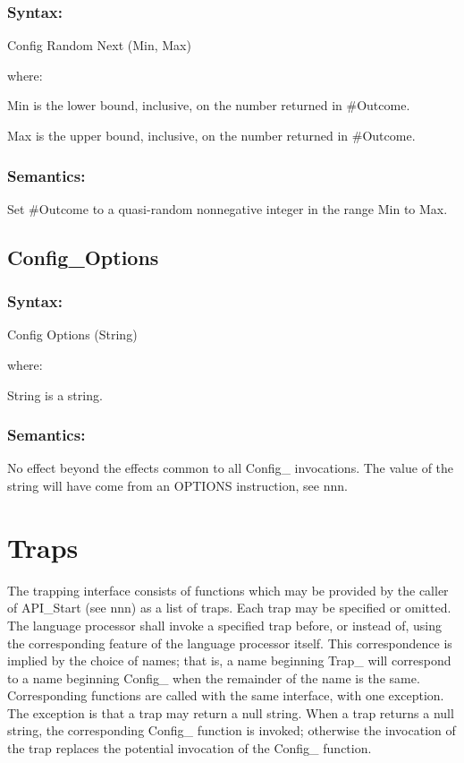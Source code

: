\subsubsection{Syntax:}\label{syntax-48}

Config Random Next (Min, Max)

where:

Min is the lower bound, inclusive, on the number returned in \#Outcome.

Max is the upper bound, inclusive, on the number returned in \#Outcome.

\subsubsection{Semantics:}\label{semantics-49}

Set \#Outcome to a quasi-random nonnegative integer in the range Min to
Max.

\subsection{Config\_Options}\label{config_options}

\subsubsection{Syntax:}\label{syntax-49}

Config Options (String)

where:

String is a string.

\subsubsection{Semantics:}\label{semantics-50}

No effect beyond the effects common to all Config\_ invocations. The
value of the string will have come from an OPTIONS instruction, see nnn.

\section{Traps}\label{traps}

The trapping interface consists of functions which may be provided by
the caller of API\_Start (see nnn) as a list of traps. Each trap may be
specified or omitted. The language processor shall invoke a specified
trap before, or instead of, using the corresponding feature of the
language processor itself. This correspondence is implied by the choice
of names; that is, a name beginning Trap\_ will correspond to a name
beginning Config\_ when the remainder of the name is the same.
Corresponding functions are called with the same interface, with one
exception. The exception is that a trap may return a null string. When a
trap returns a null string, the corresponding Config\_ function is
invoked; otherwise the invocation of the trap replaces the potential
invocation of the Config\_ function.

